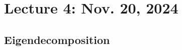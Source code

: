 
\pagebreak

\section{Lecture 4: Nov. 20, 2024}

    \subsection{Eigendecomposition} \label{sec:eigendecomposition}

